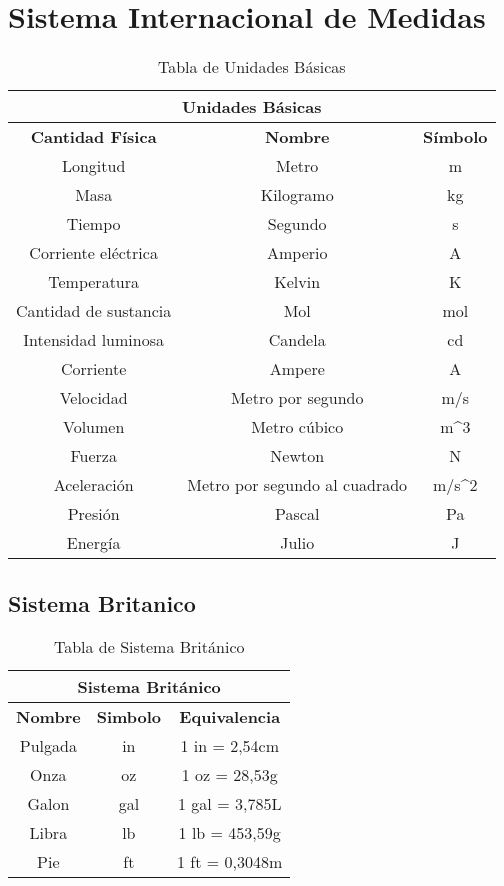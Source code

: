 \newpage
\section{Sistema Internacional de Medidas}

\begin{table}[h]
    \centering
      \renewcommand{\arraystretch}{1.5}
    \begin{tabular}{|c|c|c|}
        \hline
        \multicolumn{3}{|c|}{\textbf{Unidades Básicas}} \\
        \hline
        \textbf{Cantidad Física} & \textbf{Nombre} & \textbf{Símbolo} \\
        \hline
        Longitud & Metro & m \\
        Masa & Kilogramo & kg \\
        Tiempo & Segundo & s \\
        Corriente eléctrica & Amperio & A \\
        Temperatura & Kelvin & K \\
        Cantidad de sustancia & Mol & mol \\
        Intensidad luminosa & Candela & cd \\
        Corriente & Ampere & A \\
        Velocidad & Metro por segundo & m/s \\
        Volumen & Metro cúbico & m^3 \\
        Fuerza & Newton & N \\
        Aceleración & Metro por segundo al cuadrado & m/s^2 \\
        Presión & Pascal & Pa \\
        Energía & Julio & J \\
        \hline
    \end{tabular}
    \caption{Tabla de Unidades Básicas}
\end{table}

\subsection{Sistema Britanico}
\begin{table}[h]
    \centering
    \renewcommand{\arraystretch}{1.5}
    \begin{tabular}{|c|c|c|}
        \hline
        \multicolumn{3}{|c|}{\textbf{Sistema Británico}} \\
        \hline
        \textbf{Nombre} & \textbf{Simbolo} & \textbf{Equivalencia} \\
        \hline
        Pulgada & in & 1 in = 2,54cm \\
        Onza & oz & 1 oz = 28,53g \\
        Galon & gal & 1 gal = 3,785L \\
        Libra & lb & 1 lb = 453,59g \\
        Pie & ft & 1 ft = 0,3048m \\
        \hline
    \end{tabular}
    \caption{Tabla de Sistema Británico}
\end{table}

